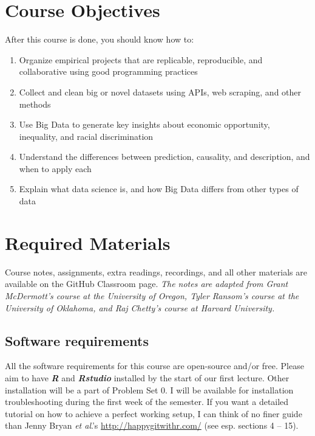 \documentclass[11pt]{article}
\begin{document}
\section*{Course Objectives}

After this course is done, you should know how to:

\begin{enumerate}
\item Organize empirical projects that are replicable, reproducible, and collaborative using good programming practices
\item Collect and clean big or novel datasets using APIs, web scraping, and other methods
\item Use Big Data to generate key insights about economic opportunity, inequality, and racial discrimination
\item Understand the differences between prediction, causality, and description, and when to apply each%
\item Explain what data science is, and how Big Data differs from other types of data %
\end{enumerate}


\section*{Required Materials}
\label{sec:materials}

Course notes, assignments, extra readings, recordings, and all other materials are available on the GitHub Classroom page. \textit{The notes are adapted from Grant McDermott's course at the University of Oregon, Tyler Ransom's course at the University of Oklahoma, and Raj Chetty's course at Harvard University.}

\subsection*{Software requirements}

All the software requirements for this course are open-source and/or free. Please aim to have \textbf{\textit{R}} and \textbf{\textit{Rstudio}} installed by the start of our first lecture. Other installation will be a part of Problem Set 0. I will be available for installation troubleshooting during the first week of the semester. If you want a detailed tutorial on how to achieve a perfect working setup, I can think of no finer guide than Jenny Bryan \textit{et al}.'s \url{http://happygitwithr.com/} (see esp. sections 4 -- 15).
\end{document}
